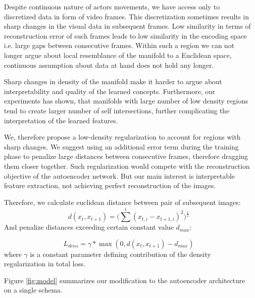 Despite continuous nature of actors movements, we have access only to discretized data in form of video frames.
This discretization sometimes results in sharp changes in the visual data in subsequent frames.
Low similarity in terms of reconstruction error of such frames leads to low similarity in the encoding space i.e. large gaps between consecutive frames.
Within such a region we can not longer argue about local resemblance of the manifold to a Euclidean space, continuous assumption about data at hand does not hold any longer.

Sharp changes in density of the manifold make it harder to argue about interpretability and quality of the learned concepts.
Furthermore, our experiments has shown, that manifolds with large number of low density regions tend to create larger number of self intersections, further complicating the interpretation of the learned features.

We, therefore propose a low-density regularization to account for regions with sharp changes.
We suggest using an additional error term during the training phase to penalize large distances between consecutive frames, therefore dragging them closer together.
Such regularization would compete with the reconstruction objective of the autoencoder network.
But our main interest is interpretable feature extraction, not achieving perfect reconstruction of the images.

Therefore, we calculate euclidean distance between pair of subsequent images:
\begin{equation*}
d(x_t, x_{t+1}) = \Big(\sum^i { (x_{t,i}-x_{t+1, i})^2}\Big)^{\frac{1}{2}}
\end{equation*}
And penalize distances exceeding certain constant value $d_{max}$:

\begin{equation*}
  L_{dens} = \gamma*\max(0, d(x_t, x_{t+1})-d_{max})
\end{equation*}
where $\gamma$ is a constant parameter defining contribution of the density regularization in total loss.


Figure \ref{fig:model} summarizes our modification to the autoencoder architecture on a single schema.


